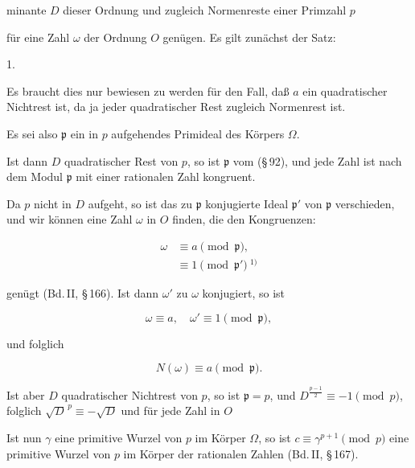 minante $D$ dieser Ordnung und zugleich Normenreste einer Primzahl $p$ 


für eine Zahl $\omega$ der Ordnung $O$ genügen. Es gilt zunächst der Satz:

1. 

Es braucht dies nur bewiesen zu werden für den Fall, daß $a$ ein quadratischer Nichtrest ist, da ja jeder quadratischer Rest zugleich Normenrest ist. %

Es sei also $\mathfrak{p}$ ein in $p$ aufgehendes Primideal des Körpers $\Omega$.

Ist dann $D$ quadratischer Rest von $p$, so ist $\mathfrak{p}$ vom  (\S\,92), und jede Zahl ist nach dem Modul $\mathfrak{p}$ mit einer rationalen Zahl kongruent.

Da $p$ nicht in $D$ aufgeht, so ist das zu $\mathfrak{p}$ konjugierte Ideal $\mathfrak{p}'$ von $\mathfrak{p}$ verschieden, und wir können eine Zahl $\omega$ in $O$ finden, die den Kongruenzen:

\[
\begin{aligned}
\omega &\equiv a \pmod{\mathfrak{p}},\\
&\equiv 1 \pmod{\mathfrak{p}'}\ ^{1)}
\end{aligned}
\]

genügt (Bd.\,II, \S\,166). Ist dann $\omega'$ zu $\omega$ konjugiert, so ist

\[ \omega \equiv a, \quad \omega' \equiv 1 \pmod{\mathfrak{p}}, \]

und folglich

\[ N(\omega) \equiv a \pmod{\mathfrak{p}}. \]

Ist aber $D$ quadratischer Nichtrest von $p$, so ist $\mathfrak{p} = p$, und $D^{\frac{p-1}{2}} \equiv -1 \pmod{p}$, folglich $\sqrt{D}^{\,p} \equiv -\sqrt{D}$ %
und für jede Zahl in $O$


Ist nun $\gamma$ eine primitive Wurzel von $p$ im Körper $\Omega$, so ist $c \equiv \gamma^{p+1} \pmod{p}$ eine primitive Wurzel von $p$ im Körper der rationalen Zahlen (Bd.\,II, \S\,167).

